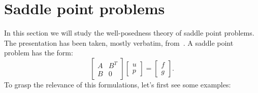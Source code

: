 \section{Saddle point problems}\label{sec:saddle-point}
In this section we will study the well-posedness theory of saddle point problems. The presentation has been taken, mostly verbatim, from~\cite{gatica2014simple}. A saddle point problem has the form:
\begin{equation}
    \begin{bmatrix}
        A & B^{T}\\ 
        B & 0
    \end{bmatrix}
    \begin{bmatrix}
        u \\ p
    \end{bmatrix}
    =
    \begin{bmatrix}
        f \\ g
    \end{bmatrix}.
\end{equation}
To grasp the relevance of this formulations, let's first see some examples:
